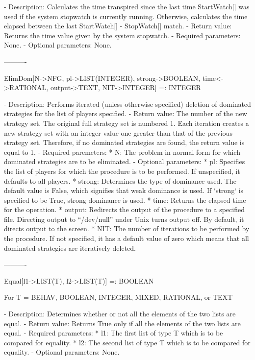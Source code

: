    -	Description:  Calculates the time transpired since the last time
	StartWatch[] was used if the system stopwatch is currently running.
	Otherwise, calculates the time elapsed between the last StartWatch[] -
	StopWatch[] match.
   -	Return value:  Returns the time value given by the system stopwatch.
   -	Required parameters:  None.
   -	Optional parameters:  None.

----------

ElimDom[N->NFG, {pl->LIST(INTEGER)}, {strong->BOOLEAN}, {time<->RATIONAL},
	{output->TEXT}, {NIT->INTEGER}] =: INTEGER

   -	Description:  Performs iterated (unless otherwise specified) deletion 
	of dominated strategies for the list of players specified.  
   -	Return value:  The number of the new strategy set.  The original full
	strategy set is numbered 1.  Each iteration creates a new strategy set
	with an integer value one greater than that of the previous strategy 
	set.  Therefore, if no dominated strategies are found, the return value
	is equal to 1.
   -	Required paremeters:
	  *  N:  The problem in normal form for which dominated strategies are
		to be eliminated.
   -	Optional parameters:
	  *  pl:  Specifies the list of players for which the procedure is to
		be performed.  If unspecified, it defaults to all players. 
 	  *  strong:  Determines the type of dominance used.  The default value
		is False, which signifies that weak dominance is used.  If 
		`strong` is specified to be True, strong dominance is used.  
	  *  time:  Returns the elapsed time for the operation.
	  *  output:  Redirects the output of the procedure to a specified 
		file.  Directing output to ``/dev/null'' under Unix turns 
		output off.  By default, it directs output to the screen.
	  *  NIT:  The number of iterations to be performed by the procedure.
		If not specified, it has a default value of zero which means 
		that all dominated strategies are iteratively deleted.

----------

Equal[l1->LIST(T), l2->LIST(T)] =: BOOLEAN

	For T = BEHAV, BOOLEAN, INTEGER, MIXED, RATIONAL, or TEXT

   -	Description:  Determines whether or not all the elements of the two
	lists are equal.
   -	Return value:  Returns True only if all the elements of the two lists
	are equal.
   -	Required parameters:  
	  *  l1:  The first list of type T which is to be compared for 
		equality.
	  *  l2:  The second list of type T which is to be compared for 
		equality.
   -	Optional parameters:  None.


